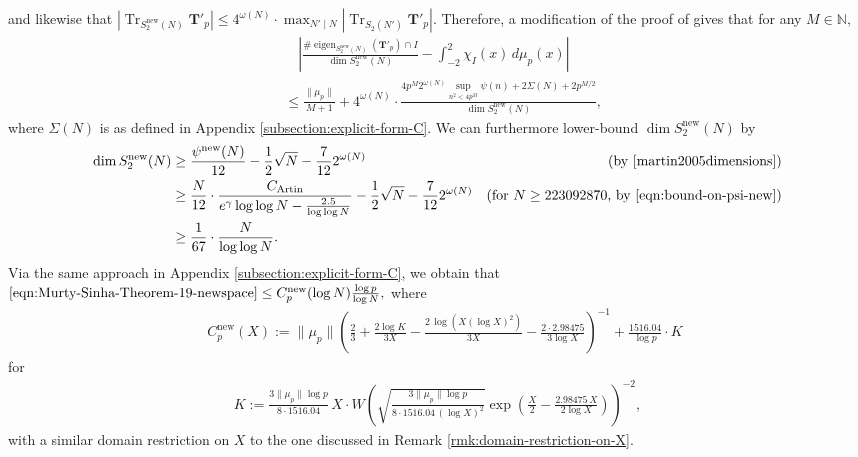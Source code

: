 \documentclass[11pt,letterpaper,reqno]{amsart}
\theoremstyle{definition}
\numberwithin{equation}{section}
\numberwithin{figure}{section}
\numberwithin{table}{section}
\newcommand{\nw}{\mathrm{new}}
\begin{document}
and likewise that $\left| \operatorname{Tr}_{S_2^\nw(N)} \mathbf{T}'_{p} \right| \leq 4^{\omega(N)} \cdot \max_{N' \mid N} \left| \operatorname{Tr}_{S_2(N')} \mathbf{T}'_{p} \right|.$ Therefore, a modification of the proof of \cite[Theorem 19]{MS07} gives that for any $M 
\in \mathbb{N},$
\begin{align}
    &\quad \left|
\frac{\# \operatorname{eigen}_{S_2^\nw(N)}(\mathbf{T}'_p) \cap I}
{\dim S_2^\nw(N)}
-
\int_{-2}^2 \chi_I(x)\, d\mu_p(x)
\right| \\
&\leq \frac{\| \mu_p\|}{M + 1} + 4^{\omega(N)}\cdot  \frac{4p^M 2^{\omega(N)} \sup_{n^2 < 4p^M} \psi(n) + 2\Sigma(N) +  2p^{M/2}}{\dim S_2^\nw(N)}, \label{eqn:Murty-Sinha-Theorem-19-newspace}
\end{align}
where $\Sigma(N)$ is as defined in Appendix \ref{subsection:explicit-form-C}. We can furthermore lower-bound $\dim S_2^\nw(N)$ by
\begin{align}
    \dim S_2^\nw(N) &\geq \frac{\psi^\nw(N)}{12} - \frac{1}{2} \sqrt{N} - \frac{7}{12} 2^{\omega(N)}  
    &\text{(by \cite[Theorem 1]{martin2005dimensions})}\\
    &\geq \frac{N }{12} \cdot \frac{C_{\text{Artin}}}{e^{\gamma} \log \log N - \frac{2.5}{\log \log N}} - \frac{1}{2} \sqrt{N} - \frac{7}{12} 2^{\omega(N)}  
    &\text{(for $N \geq 223092870$, by \eqref{eqn:bound-on-psi-new})}\\
    &\geq \frac{1}{67} \cdot \frac{N}{\log \log N}.
\end{align}
Via the same approach in Appendix \ref{subsection:explicit-form-C}, we obtain that $\eqref{eqn:Murty-Sinha-Theorem-19-newspace} \leq C_p^{\nw}(\log N) \frac{\log p}{\log N},$ where 
\begin{align}
        \quad C_p^\nw(X) :=  \| \mu_p \| \left( \frac{2}{3} + \frac{2\log K}{3X} - \frac{2 \, \log \left( X (\log X)^2 \right)}{3 X} - \frac{2 \cdot 2.98475}{3\log X}  \right)^{-1} + \frac{1516.04}{ \log p} \cdot K   \label{eqn:formula-for-C-new}
    \end{align}
    for
    \begin{align}
        K := \frac{3 \| \mu_p \| \log p}{8 \cdot 1516.04} \, X \cdot W \! \left( \sqrt{\frac{3 \| \mu_p \| \log p}{8 \cdot 1516.04 \, (\log X)^2}} \exp \left( \frac{X}{2} - \frac{2.98475 \, X }{2 \log X} \right) \right)^{-2},
    \end{align}
    with a similar domain restriction on $X$ to the one discussed in Remark \ref{rmk:domain-restriction-on-X}.\\
\end{document}
